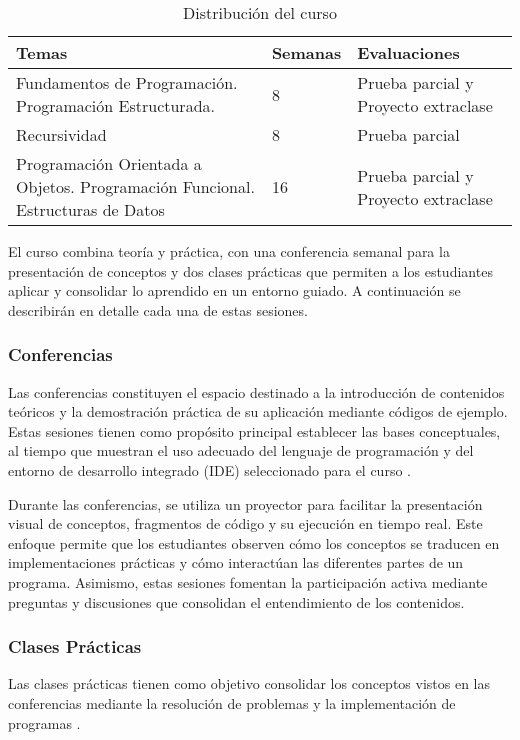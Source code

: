\documentclass{article}
\begin{document}
\begin{table}[h!]
\centering
\begin{tabular}{|p{6cm}|p{2cm}|p{3cm}|}
\hline
\textbf{Temas} & \textbf{Semanas} & \textbf{Evaluaciones} \\ \hline
Fundamentos de Programación. Programación Estructurada. 
& 8 & Prueba parcial y Proyecto extraclase \\ \hline
Recursividad & 8 & Prueba parcial \\ \hline
Programación Orientada a Objetos. Programación Funcional. Estructuras de Datos 
& 16 & Prueba parcial y Proyecto extraclase \\ \hline
\end{tabular}
\caption{Distribución del curso}
\label{tab:course_distribution}
\end{table}

El curso combina teoría y práctica, con una conferencia semanal para la presentación de conceptos y dos clases prácticas que permiten a los estudiantes aplicar y consolidar lo aprendido en un entorno guiado. A continuación se describirán en detalle cada una de estas sesiones.

\subsubsection{Conferencias}

Las conferencias constituyen el espacio destinado a la introducción de contenidos teóricos y la demostración práctica de su aplicación mediante códigos de ejemplo. Estas sesiones tienen como propósito principal establecer las bases conceptuales, al tiempo que muestran el uso adecuado del lenguaje de programación y del entorno de desarrollo integrado (IDE) seleccionado para el curso \cite{plan_estudio_e_2017}.

Durante las conferencias, se utiliza un proyector para facilitar la presentación visual de conceptos, fragmentos de código y su ejecución en tiempo real. Este enfoque permite que los estudiantes observen cómo los conceptos se traducen en implementaciones prácticas y cómo interactúan las diferentes partes de un programa. Asimismo, estas sesiones fomentan la participación activa mediante preguntas y discusiones que consolidan el entendimiento de los contenidos.

\subsubsection{Clases Prácticas}
Las clases prácticas tienen como objetivo consolidar los conceptos vistos en las conferencias mediante la resolución de problemas y la implementación de programas .
\end{document}
